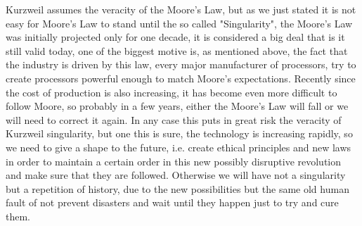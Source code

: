 \documentclass[12pt, a4page]{article}
\begin{document}
Kurzweil assumes the veracity of the Moore's Law, but as we just stated it is not easy for Moore's Law to stand until the so called "Singularity", the Moore's Law was initially projected only for one decade, it is considered a big deal that is it still valid today, one of the biggest motive is, as mentioned above, the fact that the industry is driven by this law, every major manufacturer of processors, try to create processors powerful enough to match Moore's expectations. Recently since the cost of production is also increasing, it has become even more difficult to follow Moore, so probably in a few years, either the Moore's Law will fall or we will need to correct it again. In any case this puts in great risk the veracity of Kurzweil singularity, but one this is sure, the technology is increasing rapidly, so we need to give a shape to the future, i.e. create ethical principles and new laws in order to maintain a certain order in this new possibly disruptive revolution and make sure that they are followed. Otherwise we will have not a singularity but a repetition of history, due to the new possibilities but the same old human fault of not prevent disasters and wait until they happen just to try and cure them.
\newpage

\printbibliography
\end{document}
